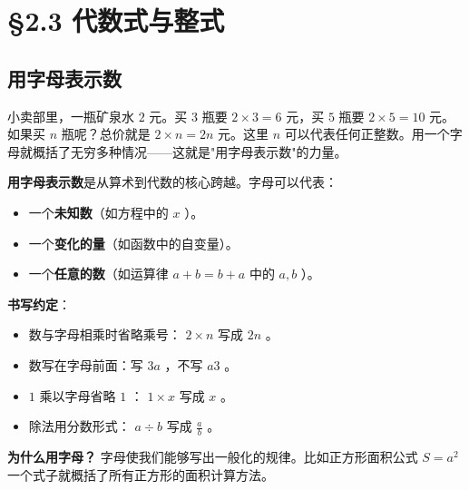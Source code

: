 \chapter{§2.3 代数式与整式}
\label{sec:2.3}





\section*{用字母表示数}


\begin{explore}


小卖部里，一瓶矿泉水 $2$ 元。买 $3$ 瓶要 $2 \times 3 = 6$ 元，买 $5$ 瓶要 $2 \times 5 = 10$ 元。如果买 $n$ 瓶呢？总价就是 $2 \times n = 2n$ 元。这里 $n$ 可以代表任何正整数。用一个字母就概括了无穷多种情况——这就是"用字母表示数"的力量。

\end{explore}

\begin{understand}


\textbf{用字母表示数}是从算术到代数的核心跨越。字母可以代表：

\begin{itemize}
  \item 一个\textbf{未知数}（如方程中的 $x$ ）。
  \item 一个\textbf{变化的量}（如函数中的自变量）。
  \item 一个\textbf{任意的数}（如运算律 $a + b = b + a$ 中的 $a, b$ ）。
\end{itemize}


\textbf{书写约定}：

\begin{itemize}
  \item 数与字母相乘时省略乘号： $2 \times n$ 写成 $2n$ 。
  \item 数写在字母前面：写 $3a$ ，不写 $a3$ 。
  \item $1$ 乘以字母省略 $1$ ： $1 \times x$ 写成 $x$ 。
  \item 除法用分数形式： $a \div b$ 写成 $\frac{a}{b}$ 。
\end{itemize}


\textbf{为什么用字母？} 字母使我们能够写出一般化的规律。比如正方形面积公式 $S = a^2$ 一个式子就概括了所有正方形的面积计算方法。

\end{understand}

